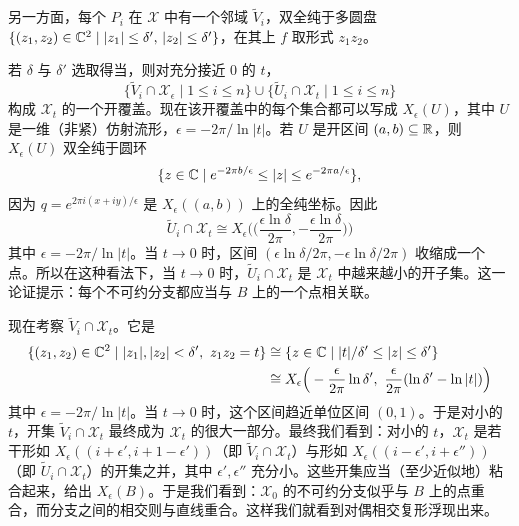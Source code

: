 另一方面，每个 $P_i$ 在 $\mathcal{X}$ 中有一个邻域 $\tilde V_i$，双全纯于多圆盘 $\{(z_1,z_2)\in\mathbb{C}^2\mid |z_1|\le\delta',\,|z_2|\le\delta'\}$，在其上 $f$ 取形式 $z_1z_2$。

若 $\delta$ 与 $\delta'$ 选取得当，则对充分接近 0 的 $t$，
\[
\{\tilde V_i\cap\mathcal{X}_\epsilon \mid 1\le i\le n\}\cup\{\tilde U_i\cap\mathcal{X}_t \mid 1\le i\le n\}
\]
构成 $\mathcal{X}_t$ 的一个开覆盖。现在该开覆盖中的每个集合都可以写成 $X_\epsilon(U)$，其中 $U$ 是一维（非紧）仿射流形，$\epsilon=-2\pi/\ln|t|$。若 $U$ 是开区间 $(a,b)\subseteq\mathbb{R}$，则 $X_\epsilon(U)$ 双全纯于圆环
\[
\{z\in\mathbb{C} \mid e^{-2\pi b/\epsilon}\le|z|\le e^{-2\pi a/\epsilon}\},
\]
因为 $q=e^{2\pi i(x+iy)/\epsilon}$ 是 $X_\epsilon((a,b))$ 上的全纯坐标。因此
\[
\tilde U_i\cap\mathcal{X}_t\cong X_\epsilon\Big(\Big(\frac{\epsilon\ln\delta}{2\pi},-\frac{\epsilon\ln\delta}{2\pi}\Big)\Big)
\]
其中 $\epsilon=-2\pi/\ln|t|$。当 $t\to0$ 时，区间 $(\epsilon\ln\delta/2\pi,-\epsilon\ln\delta/2\pi)$ 收缩成一个点。所以在这种看法下，当 $t\to0$ 时，$\tilde U_i\cap\mathcal{X}_t$ 是 $\mathcal{X}_t$ 中越来越小的开子集。这一论证提示：每个不可约分支都应当与 $B$ 上的一个点相关联。

现在考察 $\tilde V_i\cap\mathcal{X}_t$。它是
\begin{align*}
\{(z_1,z_2)\in\C^2 \mid |z_1|,|z_2|<\delta',\ z_1z_2=t\}&\cong \{z\in\C \mid |t|/\delta'\le|z|\le\delta'\}\\
&\cong X_\epsilon\Big(-\frac{\epsilon}{2\pi}\ln\delta',\ \frac{\epsilon}{2\pi}(\ln\delta'-\ln|t|)\Big)
\end{align*}
其中 $\epsilon=-2\pi/\ln|t|$。当 $t\to0$ 时，这个区间趋近单位区间 $(0,1)$。于是对小的 $t$，开集 $\tilde V_i\cap\mathcal{X}_t$ 最终成为 $\mathcal{X}_t$ 的很大一部分。最终我们看到：对小的 $t$，$\mathcal{X}_t$ 是若干形如 $X_\epsilon((i+\epsilon',i+1-\epsilon'))$（即 $\tilde V_i\cap\mathcal{X}_t$）与形如 $X_\epsilon((i-\epsilon',i+\epsilon''))$（即 $\tilde U_i\cap\mathcal{X}_t$）的开集之并，其中 $\epsilon',\epsilon''$ 充分小。这些开集应当（至少近似地）粘合起来，给出 $X_\epsilon(B)$。于是我们看到：$\mathcal{X}_0$ 的不可约分支似乎与 $B$ 上的点重合，而分支之间的相交则与直线重合。这样我们就看到对偶相交复形浮现出来。


